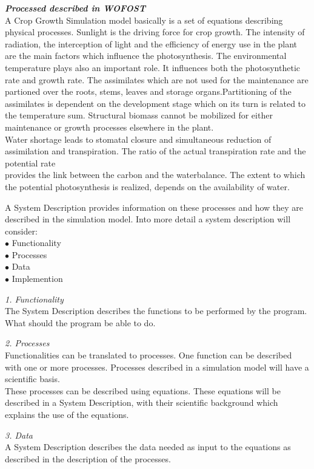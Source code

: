 \documentclass[11pt]{article}
\begin{document}
\bigskip
{\bf {\it Processed described in WOFOST\/}}\\
A Crop Growth Simulation model basically is a set of equations describing physical
processes. Sunlight is the driving force for crop growth. The intensity of radiation, the
interception of light and the efficiency of energy use in the plant are the main factors
which influ\-ence the photosynthesis. The environmental temperature plays also an
important role. It influences both the photosynthetic rate and growth rate. The
assimilates which are not used for the maintenance are partioned over the roots,
stems, leaves and storage organs.Partitioning of the assimilates is dependent on the
development stage which on its turn is related to the temperature sum. Structural
biomass cannot be mobilized for either maintenance or growth processes elsewhere in
the plant.\\
Water shortage leads to stomatal closure and simultaneous reduction of assimilation
and transpiration. The ratio of the actual transpiration rate and the potential rate\\
provides the link between the carbon and the waterbalance. The extent to which the
potential photosynthesis is realized, depends on the availability of water.

\bigskip
\bigskip
A System Description provides information on these processes and how they are
described in the simulation model. Into more detail a system description will consid\-er:\\
$\bullet$ Functionality\\
$\bullet$ Processes\\
$\bullet$ Data\\
$\bullet$ Implemention

{\it 1. Functionality\/}\\
The System Description describes the functions to be performed by the program.
What should the program be able to do. 

{\it 2. Processes\/}\\
Functionalities can be translated to processes. One function can be described with
one or more processes. Processes described in a simulation model will have a
scientific basis.\\
These processes can be described using equations. These equations will be described
in a System Description, with their scientific background which explains the use of the
equations. 

{\it 3. Data\/}\\
A System Description describes the data needed as input to the equations as
described in the description of the processes. 
\end{document}
